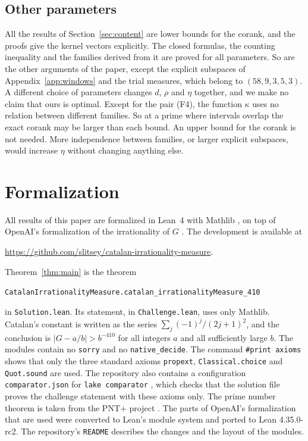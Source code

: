 \documentclass[11pt]{amsart}
\newcommand{\FormalizationURL}{https://github.com/slitsey/catalan-irrationality-measure}
\newcommand{\FormalizationLink}{\url{\FormalizationURL}}
\theoremstyle{definition}
\theoremstyle{remark}
\numberwithin{equation}{section}
\newcommand{\lean}[1]{\texttt{#1}}
\begin{document}
\subsection{Other parameters}
All the results of Section~\ref{sec:content} are lower bounds for the corank, and the proofs give the kernel
vectors explicitly. The closed formulas, the counting inequality and the families derived from it are
proved for all parameters. So are the other arguments of the paper, except the explicit subspaces of
Appendix~\ref{app:windows} and the trial measures, which belong to $(58,9,3,5,3)$. A different choice of
parameters changes $d$, $\rho$ and $\eta$ together, and we make no claim that ours is optimal. Except for the
pair (F4), the function $\kappa$ uses no relation between different families. So at a prime where intervals
overlap the exact corank may be larger than each bound. An upper bound for the corank is not needed. More
independence between families, or larger explicit subspaces, would increase $\eta$ without changing
anything else.

\section{Formalization}\label{sec:formal}

All results of this paper are formalized in Lean~4 \cite{Lean4} with Mathlib \cite{Mathlib}, on top of OpenAI's
formalization of the irrationality of $G$ \cite{OpenAI2026}. The development is available at
\begin{center}
\FormalizationLink.
\end{center}
Theorem~\ref{thm:main} is the theorem
\begin{center}
{\small\texttt{CatalanIrrationalityMeasure.catalan\_irrationalityMeasure\_410}}
\end{center}
in \lean{Solution.lean}. Its statement, in \lean{Challenge.lean}, uses only Mathlib. Catalan's constant is
written as the series $\sum_j(-1)^j/(2j+1)^2$, and the conclusion is $|G-a/b|>b^{-410}$ for all integers $a$
and all sufficiently large $b$. The modules contain no \lean{sorry} and no \lean{native\_decide}. The command
\lean{\#print axioms} shows that only the three standard axioms \lean{propext}, \lean{Classical.choice} and
\lean{Quot.sound} are used. The repository also contains a configuration \lean{comparator.json} for
\lean{lake comparator} \cite{Comparator}, which checks that the solution file proves the challenge statement
with these axioms only. The prime number theorem is taken from the PNT+ project \cite{PNTPlus}. The parts of
OpenAI's formalization that are used were converted to Lean's module system and ported to Lean
4.35.0-rc2. The repository's \texttt{README} describes the changes and the layout of the modules.
\end{document}
